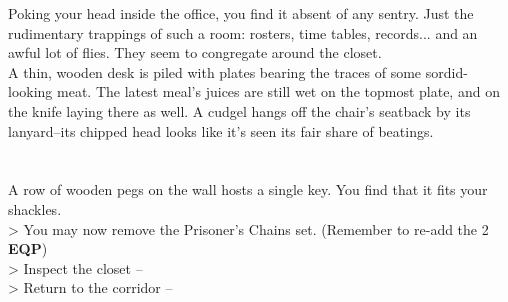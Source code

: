Poking your head inside the office, you find it absent of any sentry. Just the rudimentary trappings of such a room: rosters, time tables, records... and an awful lot of flies. They seem to congregate around the closet.\\

A thin, wooden desk is piled with plates bearing the traces of some sordid-looking meat. The latest meal’s juices are still wet on the topmost plate, and on the knife laying there as well. A cudgel hangs off the chair’s seatback by its lanyard--its chipped head looks like it’s seen its fair share of beatings.\\
\\
\\

A row of wooden pegs on the wall hosts a single key. You find that it fits your shackles.\\
> You may now remove the Prisoner’s Chains set. (Remember to re-add the 2 \textbf{EQP})\\

> Inspect the closet --  \\
> Return to the corridor -- 
